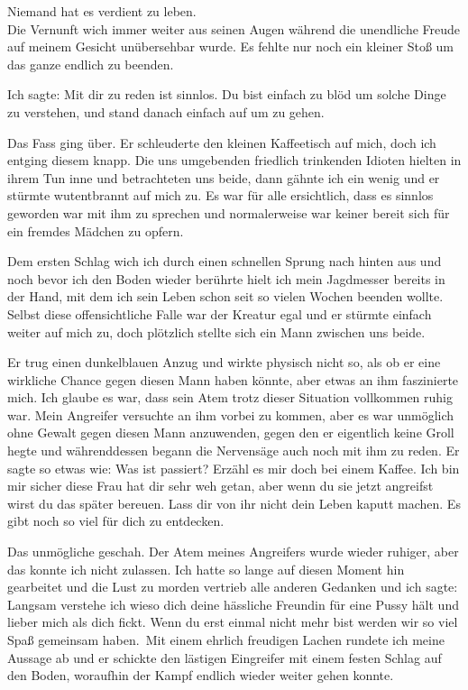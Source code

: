 \documentclass[11pt, a5paper]{article}
\newcommand{\nL}{Niemand hat es verdient zu leben.}
\begin{document}
	\begin{spacing}{1.2}
		\frqq \nL\flqq\\
		
		Die Vernunft wich immer weiter aus seinen Augen während die unendliche Freude auf meinem Gesicht unübersehbar wurde. Es fehlte nur noch ein kleiner Stoß um das ganze endlich zu beenden.
		
		Ich sagte: \frqq Mit dir zu reden ist sinnlos. Du bist einfach zu blöd um solche Dinge zu verstehen\flqq , und stand danach einfach auf um zu gehen.
		
		Das Fass ging über. Er schleuderte den kleinen Kaffeetisch auf mich, doch ich entging diesem knapp. Die uns umgebenden friedlich trinkenden Idioten hielten in ihrem Tun inne und betrachteten uns beide, dann gähnte ich ein wenig und er stürmte wutentbrannt auf mich zu. Es war für alle ersichtlich, dass es sinnlos geworden war mit ihm zu sprechen und normalerweise war keiner bereit sich für ein fremdes Mädchen zu opfern.
		
		Dem ersten Schlag wich ich durch einen schnellen Sprung nach hinten aus und noch bevor ich den Boden wieder berührte hielt ich mein Jagdmesser bereits in der Hand, mit dem ich sein Leben schon seit so vielen Wochen beenden wollte. Selbst diese offensichtliche Falle war der Kreatur egal und er stürmte einfach weiter auf mich zu, doch plötzlich stellte sich ein Mann zwischen uns beide.
		
		Er trug einen dunkelblauen Anzug und wirkte physisch nicht so, als ob er eine wirkliche Chance gegen diesen Mann haben könnte, aber etwas an ihm faszinierte mich. Ich glaube es war, dass sein Atem trotz dieser Situation vollkommen ruhig war. Mein Angreifer versuchte an ihm vorbei zu kommen, aber es war unmöglich ohne Gewalt gegen diesen Mann anzuwenden, gegen den er eigentlich keine Groll hegte und währenddessen begann die Nervensäge auch noch mit ihm zu reden. Er sagte so etwas wie: \frqq Was ist passiert? Erzähl es mir doch bei einem Kaffee. Ich bin mir sicher diese Frau hat dir sehr weh getan, aber wenn du sie jetzt angreifst wirst du das später bereuen. Lass dir von ihr nicht dein Leben kaputt machen. Es gibt noch so viel für dich zu entdecken.\flqq
		
		Das unmögliche geschah. Der Atem meines Angreifers wurde wieder ruhiger, aber das konnte ich nicht zulassen. Ich hatte so lange auf diesen Moment hin gearbeitet und die Lust zu morden vertrieb alle anderen Gedanken und ich sagte: \frqq Langsam verstehe ich wieso dich deine hässliche Freundin für eine Pussy hält und lieber mich als dich fickt. Wenn du erst einmal nicht mehr bist werden wir so viel Spaß gemeinsam haben.\flqq\ Mit einem ehrlich freudigen Lachen rundete ich meine Aussage ab und er schickte den lästigen Eingreifer mit einem festen Schlag auf den Boden, woraufhin der Kampf endlich wieder weiter gehen konnte.
		

\end{spacing}
\end{document}
